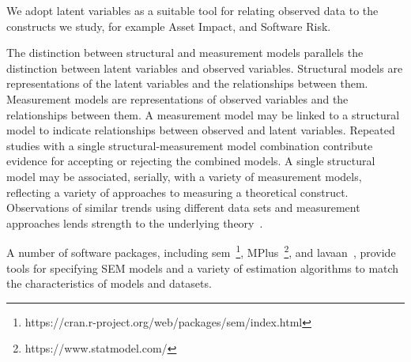 We adopt latent variables as a suitable tool for relating observed data to the constructs we study, for example Asset Impact, and Software Risk.

The distinction between structural and measurement models parallels the distinction between latent variables and observed variables. Structural models are representations of the latent variables and the relationships between them. Measurement models are representations of observed variables and the relationships between them.  A measurement model may be linked to a structural model to indicate relationships between observed and latent variables. Repeated studies with a single structural-measurement model combination contribute evidence for accepting or rejecting the combined models. A single structural model may be associated, serially, with a variety of measurement models, reflecting a variety of approaches to measuring a theoretical construct.  Observations of similar trends using different data sets and measurement approaches lends strength to the underlying theory~\cite{basili1999building,wohlin2000experimentation}. 

A number of software packages, including sem~\footnote{https://cran.r-project.org/web/packages/sem/index.html}, MPlus~\footnote{https://www.statmodel.com/}, and lavaan~\cite{roseel2012lavaan}, provide tools for specifying SEM models and a variety of estimation algorithms to match the characteristics of models and datasets. 

